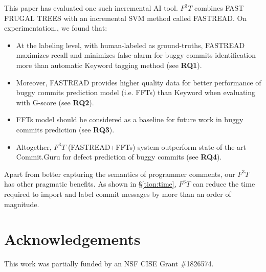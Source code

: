 \documentclass[10pt,journal,compsoc]{IEEEtran}
\newcommand{\bi}{\begin{itemize}[leftmargin=0.4cm]}
\newcommand{\ei}{\end{itemize}}
\newcommand{\tion}[1]{\S\ref{tion:#1}}
\begin{document}
This paper has evaluated one such incremental AI tool.  $F^3T$ combines
FAST  FRUGAL TREES with an incremental SVM method called
FASTREAD.
On experimentation., we found that:
\bi
    \item At the labeling level, with human-labeled as ground-truths, FASTREAD maximizes recall and minimizes false-alarm for buggy commits identification more than automatic Keyword tagging method (see {\bf RQ1}). 
    \item Moreover, FASTREAD provides higher quality data for better performance of buggy commits prediction model (i.e. FFTs) than Keyword when evaluating with G-score (see {\bf RQ2}).  
    \item FFTs model should be considered as a baseline for future work in buggy commits prediction (see {\bf RQ3}). 
    \item Altogether, $F^3T$ (FASTREAD+FFTs) system  outperform state-of-the-art Commit.Guru for defect prediction of buggy commits (see
    {\bf RQ4}).  
\ei
Apart from better capturing the semantics of programmer comments, our $F^3T$ has other pragmatic benefits. As shown in \tion{time},
$F^3T$ can reduce the time required to import and label commit messages  by more than an order of magnitude.
 


\section*{Acknowledgements}
This work was partially funded by an NSF CISE Grant \#1826574.



\balance
% 
% 

 
\end{document}
